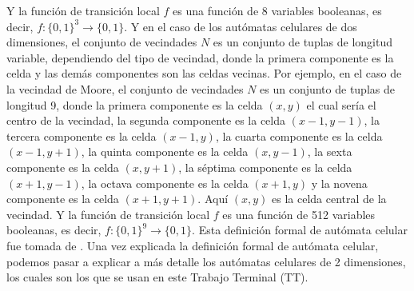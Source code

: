         Y la funci\'on de transici\'on local $f$ es una funci\'on de 8 variables booleanas, es decir, $f: \{0,1\}^3 \rightarrow \{0,1\}$.
    \vskip 0.5cm    
    Y en el caso de los aut\'omatas celulares de dos dimensiones, el conjunto de vecindades $N$ es un conjunto de tuplas de longitud variable, 
        dependiendo del tipo de vecindad, donde la primera componente es la celda y las dem\'as componentes son las celdas vecinas. Por ejemplo, 
        en el caso de la vecindad de Moore, el conjunto de vecindades $N$ es un conjunto de tuplas de longitud 9, donde la primera componente es la celda
        $(x,y)$ el cual ser\'ia el centro de la vecindad, la segunda componente es la celda $(x-1,y-1)$, la tercera componente es la celda $(x-1,y)$,
        la cuarta componente es la celda $(x-1,y+1)$, la quinta componente es la celda $(x,y-1)$, la sexta componente es la celda $(x,y+1)$, la s\'eptima
        componente es la celda $(x+1,y-1)$, la octava componente es la celda $(x+1,y)$ y la novena componente es la celda $(x+1,y+1)$. Aqu\'i 
        $(x,y)$ es la celda central de la vecindad. Y la funci\'on de transici\'on local $f$ es una funci\'on de 512 variables booleanas, es decir,
        $f: \{0,1\}^{9} \rightarrow \{0,1\}$.
    \vskip 0.5cm
    Esta definici\'on formal de aut\'omata celular fue tomada de \cite{Codd1968}. Una vez explicada la definici\'on formal de aut\'omata celular,
        podemos pasar a explicar a m\'as detalle los aut\'omatas celulares de 2 dimensiones, los cuales son los que se usan en este Trabajo Terminal (TT).
    \vskip 0.5cm